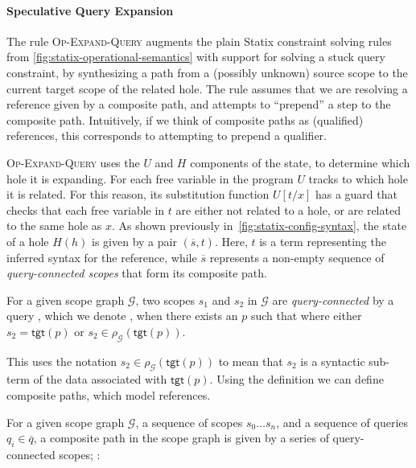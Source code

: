 \paragraph{Speculative Query Expansion}
The rule \textsc{Op-Expand-Query} augments the plain Statix constraint solving rules from \cref{fig:statix-operational-semantics} with support for solving a stuck query constraint,
by synthesizing a path from a (possibly unknown) source scope to the current target scope of the related hole.
The rule assumes that we are resolving a reference given by a composite path, and attempts to ``prepend'' a step to the composite path.
Intuitively, if we think of composite paths as (qualified) references, this corresponds to attempting to prepend a qualifier.


\textsc{Op-Expand-Query} uses the $U$ and $H$ components of the state, to determine which hole it is expanding.
For each free variable in the program $U$ tracks to which hole it is related.
For this reason, its substitution function $U[t/x]$ has a guard that checks that each free variable in $t$ are either not related to a hole, or are related to the same hole as $x$.
As shown previously in~\cref{fig:statix-config-syntax}, the state of a hole $H(h)$ is given by a pair $(\overline{s}, t)$.
Here, $t$ is a term representing the inferred syntax for the reference, while $\overline{s}$ represents a non-empty sequence of \emph{query-connected scopes} that form its composite path.



\begin{definition}
  For a given scope graph $\mathcal{G}$, two scopes $s_1$ and $s_2$ in $\mathcal{G}$ are \emph{query-connected} by a query , which we denote , when there exists an $p$  such that  where either $s_2 = \mathsf{tgt}(p)$ or $s_2 \in \rho_{\mathcal{G}}(\mathsf{tgt}(p))$.
  \label{def:query-connected-scopes}
\end{definition}

This uses the notation $s_2 \in \rho_{\mathcal{G}}(\mathsf{tgt}(p))$ to mean that $s_2$ is a syntactic sub-term of the data associated with $\mathsf{tgt}(p)$.
Using the definition we can define composite paths, which model references.

\begin{definition}
  \label{def:composite-path}
  For a given scope graph $\mathcal{G}$, a sequence of scopes $s_0\ldots s_n$, and a sequence of queries $q_i \in \overline{q}$, a composite path in the scope graph is given by a series of query-connected scopes; \ie:
\end{definition}

